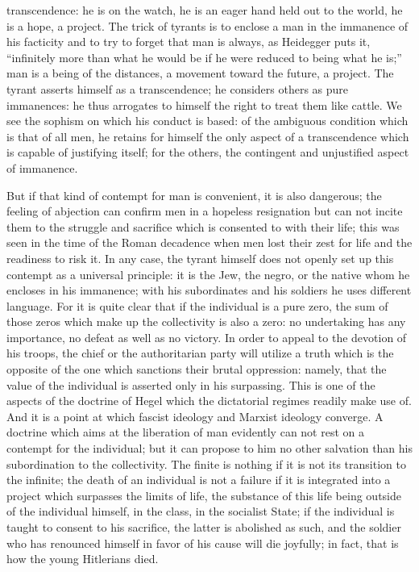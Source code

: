 \documentclass[11pt]{article}
\begin{document}
{{transcendence: he is on the watch, he is an eager hand held out to the world, he is a hope, a project. The trick of tyrants is to enclose a man in the immanence of his facticity and to try to forget that man is always, as Heidegger puts it, “infinitely more than what he would be if he were reduced to being what he is;” man is a being of the distances, a movement toward the future, a project. The tyrant asserts himself as a transcendence; he considers others as pure immanences: he thus arrogates to himself the right to treat them like cattle. We see the sophism on which his conduct is based: of the ambiguous condition which is that of all men, he retains for himself the only aspect of a transcendence which is capable of justifying itself; for the others, the contingent and unjustified aspect of immanence.

But if that kind of contempt for man is convenient, it is also dangerous; the feeling of abjection can confirm men in a hopeless resignation but can not incite them to the struggle and sacrifice which is consented to with their life; this was seen in the time of the Roman decadence when men lost their zest for life and the readiness to risk it. In any case, the tyrant himself does not openly set up this contempt as a universal principle: it is the Jew, the negro, or the native whom he encloses in his immanence; with his subordinates and his soldiers he uses different language. For it is quite clear that if the individual is a pure zero, the sum of those zeros which make up the collectivity is also a zero: no undertaking has any importance, no defeat as well as no victory. In order to appeal to the devotion of his troops, the chief or the authoritarian party will utilize a truth which is the opposite of the one which sanctions their brutal oppression: namely, that the value of the individual is asserted only in his surpassing. This is one of the aspects of the doctrine of Hegel which the dictatorial regimes readily make use of. And it is a point at which fascist ideology and Marxist ideology converge. A doctrine which aims at the liberation of man evidently can not rest on a contempt for the individual; but it can propose to him no other salvation than his subordination to the collectivity. The finite is nothing if it is not its transition to the infinite; the death of an individual is not a failure if it is integrated into a project which surpasses the limits of life, the substance of this life being outside of the individual himself, in the class, in the socialist State; if the individual is taught to consent to his sacrifice, the latter is abolished as such, and the soldier who has renounced himself in favor of his cause will die joyfully; in fact, that is how the young Hitlerians died.

}}
\end{document}
